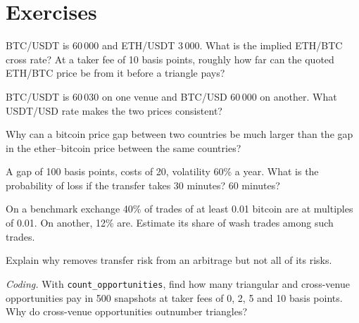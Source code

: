 \section{Exercises}

\begin{exercise}[$\star$]\label{exo:m3:spot-markets:1}
BTC/USDT is 60\,000 and ETH/USDT 3\,000. What is the implied ETH/BTC cross rate? At a taker fee of 10 basis
points, roughly how far can the quoted ETH/BTC price be from it before a triangle pays?
\end{exercise}

\begin{exercise}[$\star$]\label{exo:m3:spot-markets:2}
BTC/USDT is 60\,030 on one venue and BTC/USD 60\,000 on another. What USDT/USD rate makes the two prices
consistent?
\end{exercise}

\begin{exercise}[$\star$]\label{exo:m3:spot-markets:3}
Why can a bitcoin price gap between two countries be much larger than the gap in the ether--bitcoin price between
the same countries?
\end{exercise}

\begin{exercise}[$\star\star$]\label{exo:m3:spot-markets:4}
A gap of 100 basis points, costs of 20, volatility 60\% a year. What is the probability of loss if the transfer
takes 30 minutes? 60 minutes?
\end{exercise}

\begin{exercise}[$\star\star$]\label{exo:m3:spot-markets:5}
On a benchmark exchange 40\% of trades of at least 0.01 bitcoin are at multiples of 0.01. On another, 12\% are.
Estimate its share of wash trades among such trades.
\end{exercise}

\begin{exercise}[$\star\star$]\label{exo:m3:spot-markets:6}
Explain why  removes transfer risk from an arbitrage but not all of its risks.
\end{exercise}

\begin{exercise}[$\star\star\star$]\label{exo:m3:spot-markets:7}
\emph{Coding.} With \texttt{count\_opportunities}, find how many triangular and cross-venue opportunities pay in 500
snapshots at taker fees of 0, 2, 5 and 10 basis points. Why do cross-venue opportunities outnumber triangles?
\end{exercise}

